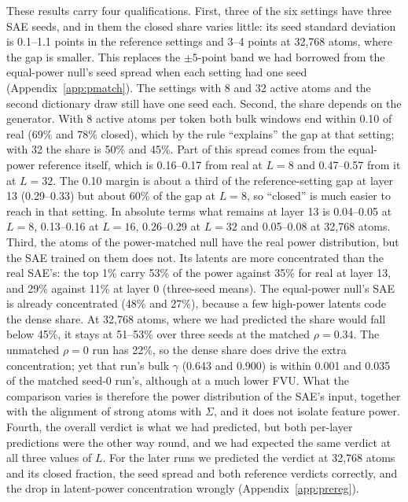 \documentclass[10pt,twocolumn]{article}
\newcommand{\Sig}{\Sigma}
\begin{document}
These results carry four qualifications. First, three of the six settings have three SAE seeds, and in them the closed share varies little: its seed standard deviation is 0.1--1.1 points in the reference settings and 3--4 points at 32,768 atoms, where the gap is smaller. This replaces the $\pm 5$-point band we had borrowed from the equal-power null's seed spread when each setting had one seed (Appendix~\ref{app:pmatch}). The settings with 8 and 32 active atoms and the second dictionary draw still have one seed each. Second, the share depends on the generator. With 8 active atoms per token both bulk windows end within 0.10 of real (69\% and 78\% closed), which by the rule ``explains'' the gap at that setting; with 32 the share is 50\% and 45\%. Part of this spread comes from the equal-power reference itself, which is 0.16--0.17 from real at $L=8$ and 0.47--0.57 from it at $L=32$. The 0.10 margin is about a third of the reference-setting gap at layer 13 (0.29--0.33) but about 60\% of the gap at $L=8$, so ``closed'' is much easier to reach in that setting. In absolute terms what remains at layer 13 is 0.04--0.05 at $L=8$, 0.13--0.16 at $L=16$, 0.26--0.29 at $L=32$ and 0.05--0.08 at 32,768 atoms. Third, the atoms of the power-matched null have the real power distribution, but the SAE trained on them does not. Its latents are more concentrated than the real SAE's: the top 1\% carry 53\% of the power against 35\% for real at layer 13, and 29\% against 11\% at layer 0 (three-seed means). The equal-power null's SAE is already concentrated (48\% and 27\%), because a few high-power latents code the dense share. At 32,768 atoms, where we had predicted the share would fall below 45\%, it stays at 51--53\% over three seeds at the matched $\rho=0.34$. The unmatched $\rho=0$ run has 22\%, so the dense share does drive the extra concentration; yet that run's bulk $\gamma$ (0.643 and 0.900) is within 0.001 and 0.035 of the matched seed-0 run's, although at a much lower FVU. What the comparison varies is therefore the power distribution of the SAE's input, together with the alignment of strong atoms with $\Sig$, and it does not isolate feature power. Fourth, the overall verdict is what we had predicted, but both per-layer predictions were the other way round, and we had expected the same verdict at all three values of $L$. For the later runs we predicted the verdict at 32,768 atoms and its closed fraction, the seed spread and both reference verdicts correctly, and the drop in latent-power concentration wrongly (Appendix~\ref{app:prereg}).
\end{document}
